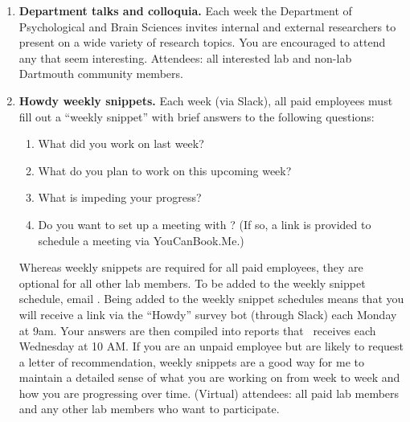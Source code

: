 \documentclass{tufte-book} %
\begin{document}
\begin{enumerate}
  \item \textbf{Department talks and colloquia.} Each week the
    Department of Psychological and Brain Sciences invites internal
    and external researchers to present on a wide variety of research
    topics.  You are encouraged to attend any that seem interesting.
    Attendees: all interested lab and non-lab Dartmouth community
    members.
    \item \textbf{Howdy weekly snippets.} Each week (via Slack), all
      paid employees must fill out a ``weekly snippet'' with brief
      answers to the following questions:
      \begin{enumerate}
      \item What did you work on last week?
      \item What do you plan to work on this upcoming week?
      \item What is impeding your progress?
      \item Do you want to set up a meeting with \director?  (If so, a
        link is provided to schedule a meeting via YouCanBook.Me.)
      \end{enumerate}
      Whereas weekly snippets are required for all paid employees,
      they are optional for all other lab members.  To be added to the
      weekly snippet schedule, email \director.  Being added to the
      weekly snippet schedules means that you will receive a link via
      the ``Howdy'' survey bot (through Slack) each Monday at 9am.
      Your answers are then compiled into reports that
      \director~receives each Wednesday at 10 AM.  If you are an
      unpaid employee but are likely to request a letter of
      recommendation, weekly snippets are a good way for me to
      maintain a detailed sense of what you are working on from week
      to week and how you are progressing over time.  (Virtual)
      attendees: all paid lab members and any other lab members who
      want to participate.
\end{enumerate}

{}
\end{document}
